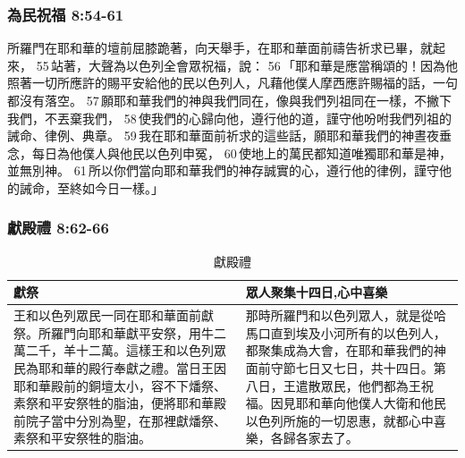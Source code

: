\subsubsection{為民祝福 8:54-61}
所羅門在耶和華的壇前屈膝跪著，向天舉手，在耶和華面前禱告祈求已畢，就起來， 55 站著，大聲為以色列全會眾祝福，說： 56 「耶和華是應當稱頌的！因為他照著一切所應許的賜平安給他的民以色列人，凡藉他僕人摩西應許賜福的話，一句都沒有落空。 57 願耶和華我們的神與我們同在，像與我們列祖同在一樣，不撇下我們，不丟棄我們， 58 使我們的心歸向他，遵行他的道，謹守他吩咐我們列祖的誡命、律例、典章。 59 我在耶和華面前祈求的這些話，願耶和華我們的神晝夜垂念，每日為他僕人與他民以色列申冤， 60 使地上的萬民都知道唯獨耶和華是神，並無別神。 61 所以你們當向耶和華我們的神存誠實的心，遵行他的律例，謹守他的誡命，至終如今日一樣。」

\subsubsection{獻殿禮 8:62-66}
\begin{table}[H]
\vspace{-3mm}
\centering 
\begin{tabular}{p{9.2cm}|p{8.45cm}}\hline\hline
獻祭&眾人聚集十四日,心中喜樂\\\hline\hline
王和以色列眾民一同在耶和華面前獻祭。所羅門向耶和華獻平安祭，用牛二萬二千，羊十二萬。這樣王和以色列眾民為耶和華的殿行奉獻之禮。當日王因耶和華殿前的銅壇太小，容不下燔祭、素祭和平安祭牲的脂油，便將耶和華殿前院子當中分別為聖，在那裡獻燔祭、素祭和平安祭牲的脂油。
&那時所羅門和以色列眾人，就是從哈馬口直到埃及小河所有的以色列人，都聚集成為大會，在耶和華我們的神面前守節七日又七日，共十四日。第八日，王遣散眾民，他們都為王祝福。因見耶和華向他僕人大衛和他民以色列所施的一切恩惠，就都心中喜樂，各歸各家去了。\\\hline
\end{tabular}
\caption{獻殿禮}
\end{table}


